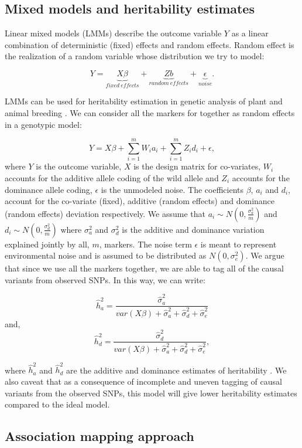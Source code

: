 \subsection{Mixed models and heritability estimates}

Linear mixed models (LMMs) describe the outcome variable $Y$ as a linear combination of deterministic (fixed) effects and random effects. Random effect is the realization of a random variable whose distribution we try to model:

$$Y = \underbrace{X\beta}_{fixed\ effects} + \underbrace{Zb}_{random\ effects} + \underbrace{\epsilon}_{noise}.$$

LMMs can be used for heritability estimation in genetic analysis of plant and animal breeding \cite{Ogunniyan2014,Valdar2006}. We can consider all the markers for together as random effects in a genotypic model:

$$Y = X\beta + \sum_{i=1}^{m}W_ia_i + \sum_{i=1}^{m}Z_id_i + \epsilon,$$
where $Y$ is the outcome variable, $X$ is the design matrix for co-variates, $W_i$ accounts for the additive allele coding of the wild allele and $Z_i$ accounts for the dominance allele coding, $\epsilon$ is the unmodeled noise. The coefficients $\beta$, $a_i$ and $d_i$, account for the co-variate (fixed), additive (random effects) and dominance (random effects) deviation respectively. We assume that $a_i \sim N(0, \frac{\sigma^2_a}{m})$ and $d_i \sim N(0, \frac{\sigma^2_d}{m})$ where $\sigma_a^2$ and $\sigma_d^2$ is the additive and dominance variation explained jointly by all, $m$, markers. The noise term $\epsilon$ is meant to represent environmental noise and is assumed to be distributed as $N(0, \sigma_e^2)$. We argue that since we use all the markers together, we are able to tag all of the causal variants from observed SNPs. In this way, we can write:

$$\hat{h}^2_a = \frac{\hat{\sigma}_a^2}{var(X\beta) + \hat{\sigma}_a^2 + \hat{\sigma}_d^2 + \hat{\sigma}^2_e}$$ and, 
$$\hat{h}^2_d = \frac{\hat{\sigma}_d^2}{var(X\beta) + \hat{\sigma}_a^2 + \hat{\sigma}_d^2 + \hat{\sigma}^2_e},$$

where $\hat{h}^2_a$ and $\hat{h}^2_d$ are the additive and dominance estimates of heritability \cite{Da2014}. We also caveat that as a consequence of incomplete and uneven tagging of causal variants from the observed SNPs, this model will give lower heritability estimates compared to the ideal model.

\subsection{Association mapping approach}

